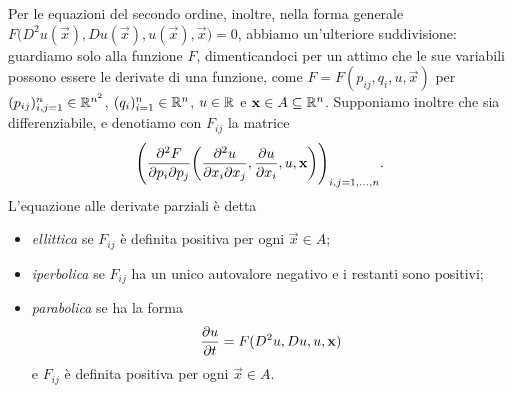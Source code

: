 Per le equazioni del secondo ordine, inoltre, nella forma generale $F\bigl(D^2u(\vec x),Du(\vec x),u(\vec x),\vec x\bigr)=0$, abbiamo un'ulteriore suddivisione: guardiamo solo alla funzione $F$, dimenticandoci per un attimo che le sue variabili possono essere le derivate di una funzione, come $F=F(p_{ij},q_i,u,\vec x)$ per $(p_{ij})_{i,j=1}^n\in\mathbb{R}^{n^2}$, $(q_i)_{i=1}^n\in\mathbb{R}^n$, $u\in\mathbb{R}$ e $\mathbf{x}\in A\subseteq\mathbb{R}^n$.
Supponiamo inoltre che sia differenziabile, e denotiamo con $F_{ij}$ la matrice
\begin{equation*}
    \Biggl(\frac{\partial^2F}{\partial p_i\partial p_j}\biggl(\frac{\partial^2 u}{\partial x_i\partial x_j},\frac{\partial {u}}{\partial {x_i}},u,\mathbf{x}\biggr)\Biggr)_{i,j=1,\dotsc,n}.
\end{equation*}
L'equazione alle derivate parziali è detta
\begin{itemize}
    \item \emph{ellittica} se $F_{ij}$ è definita positiva per ogni $\vec x\in A$;
    \item \emph{iperbolica} se $F_{ij}$ ha un unico autovalore negativo e i restanti sono positivi;
    \item \emph{parabolica} se ha la forma
        \begin{equation}
            \frac{\partial {u}}{\partial {t}}=F(D^2u,Du,u,\mathbf{x})
            \label{eq:pde-parabolica}
        \end{equation}
        e $F_{ij}$ è definita positiva per ogni $\vec x\in A$.
\end{itemize}

